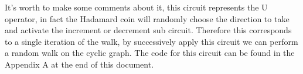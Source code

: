 It's worth to make some comments about it, this circuit represents the U operator, in fact the Hadamard coin will 
randomly choose the direction to take and activate the increment or decrement sub circuit. Therefore this corresponds
to a single iteration of the walk, by successively apply this circuit we can perform a random walk on the cyclic graph.
The code for this circuit can be found in the Appendix A at the end of this document.  

